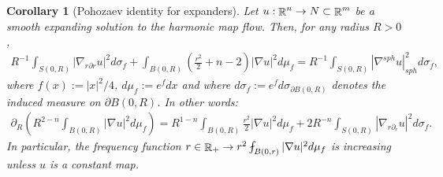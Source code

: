 \documentclass[a4paper,11pt,reqno]{amsart}
\newtheorem{coro}[defn]{Corollary}
\newtheorem{rk}[defn]{Remark}
\def\R{\mathop{\rm \mathbb{R}}\nolimits}
\begin{document}
\begin{coro}[Pohozaev identity for expanders]\label{Poho-exp}
Let $u:\R^n\rightarrow N\subset\R^m$ be a smooth expanding solution to the harmonic map flow. Then, for any radius $R>0$,
\begin{eqnarray*}
R^{-1}\int_{S(0,R)}|\nabla_{r\partial r}u|^2d\sigma_f+\int_{B(0,R)}\left(\frac{r^2}{2}+n-2\right)|\nabla u|^2d\mu_f=R^{-1}\int_{S(0,R)}|\nabla^{sph}u|_{sph}^2d\sigma_f,
\end{eqnarray*}
where $f(x):=|x|^2/4$, $d\mu_f:=e^fdx$ and where $d\sigma_f:=e^fd\sigma_{\partial B(0,R)}$ denotes the induced measure on $\partial B(0,R)$. 
In other words:
\begin{eqnarray*}
\partial_R\left(R^{2-n}\int_{B(0,R)}|\nabla u|^2d\mu_f\right)=R^{1-n}\int_{B(0,R)}\frac{r^2}{2}|\nabla u|^2d\mu_f+2R^{-n}\int_{S(0,R)}|\nabla_{r\partial_r}u|^2d\sigma_f.
\end{eqnarray*}
In particular, the frequency function $r\in\R_+\rightarrow r^2\fint_{B(0,r)}|\nabla u|^2d\mu_f$ is increasing unless $u$ is a constant map. 
\end{coro}
\end{document}
